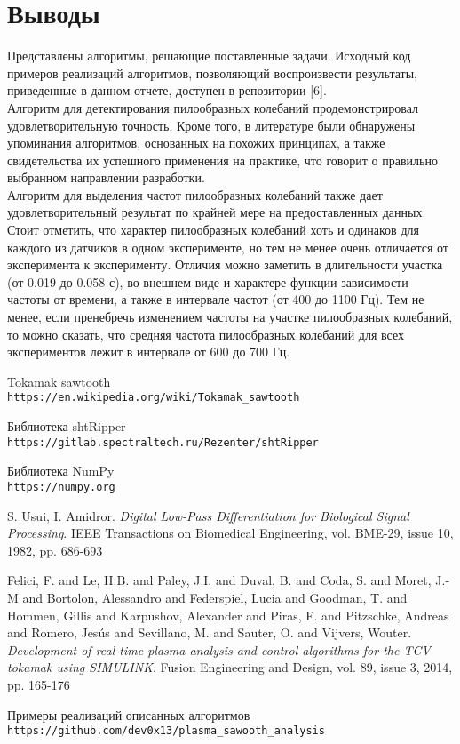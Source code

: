 \documentclass{report}
\begin{document}
\section{Выводы}
Представлены алгоритмы, решающие поставленные задачи. Исходный код примеров реализаций алгоритмов, позволяющий воспроизвести результаты, приведенные в данном отчете, доступен в репозитории [6].
\\

Алгоритм для детектирования пилообразных колебаний продемонстрировал удовлетворительную точность. Кроме того, в литературе были обнаружены упоминания алгоритмов, основанных на похожих принципах, а также свидетельства их успешного применения на практике, что говорит о правильно выбранном направлении разработки.
\\

Алгоритм для выделения частот пилообразных колебаний также дает удовлетворительный результат по крайней мере на предоставленных данных. Стоит отметить, что характер пилообразных колебаний хоть и одинаков для каждого из датчиков в одном эксперименте, но тем не менее очень отличается от эксперимента к эксперименту. Отличия можно заметить в длительности участка (от 0.019 до 0.058 с), во внешнем виде и характере функции зависимости частоты от времени, а также в интервале частот (от 400 до 1100 Гц). Тем не менее, если пренебречь изменением частоты на участке пилообразных колебаний, то можно сказать, что средняя частота пилообразных колебаний для всех экспериментов лежит в интервале от 600 до 700 Гц.

\begin{thebibliography}{9}

Tokamak sawtooth
\\\texttt{https://en.wikipedia.org/wiki/Tokamak\_sawtooth}

Библиотека shtRipper
\\\texttt{https://gitlab.spectraltech.ru/Rezenter/shtRipper}

Библиотека NumPy
\\\texttt{https://numpy.org}

S. Usui, I. Amidror.
\textit{Digital Low-Pass Differentiation for Biological Signal Processing}. 
IEEE Transactions on Biomedical Engineering, vol. BME-29, issue 10, 1982, pp. 686-693

Felici, F. and Le, H.B. and Paley, J.I. and Duval, B. and Coda, S. and Moret, J.-M and Bortolon, Alessandro and Federspiel, Lucia and Goodman, T. and Hommen, Gillis and Karpushov, Alexander and Piras, F. and Pitzschke, Andreas and Romero, Jesús and Sevillano, M. and Sauter, O. and Vijvers, Wouter.
\textit{Development of real-time plasma analysis and control algorithms for the TCV tokamak using SIMULINK}.
Fusion Engineering and Design, vol. 89, issue 3, 2014, pp. 165-176

Примеры реализаций описанных алгоритмов
\\\texttt{https://github.com/dev0x13/plasma\_sawooth\_analysis}
\end{thebibliography}
\end{document}
